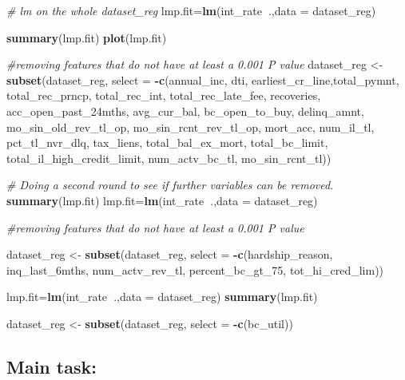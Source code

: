 \documentclass[]{article}
\newenvironment{Shaded}{\begin{snugshade}}{\end{snugshade}}
\newcommand{\CommentTok}[1]{\textcolor[rgb]{0.56,0.35,0.01}{\textit{#1}}}
\newcommand{\DataTypeTok}[1]{\textcolor[rgb]{0.13,0.29,0.53}{#1}}
\newcommand{\DecValTok}[1]{\textcolor[rgb]{0.00,0.00,0.81}{#1}}
\newcommand{\KeywordTok}[1]{\textcolor[rgb]{0.13,0.29,0.53}{\textbf{#1}}}
\newcommand{\NormalTok}[1]{#1}
\newcommand{\OperatorTok}[1]{\textcolor[rgb]{0.81,0.36,0.00}{\textbf{#1}}}
\newcommand{\StringTok}[1]{\textcolor[rgb]{0.31,0.60,0.02}{#1}}
\begin{document}
\begin{Shaded}
\begin{Highlighting}[]
\CommentTok{# lm on the whole dataset_reg}
\NormalTok{lmp.fit=}\KeywordTok{lm}\NormalTok{(int_rate}\OperatorTok{~}\NormalTok{.,}\DataTypeTok{data =}\NormalTok{ dataset_reg)}

\KeywordTok{summary}\NormalTok{(lmp.fit)}
\KeywordTok{plot}\NormalTok{(lmp.fit)}

\CommentTok{#removing features that do not have at least a 0.001 P value}
\NormalTok{dataset_reg <-}\StringTok{ }\KeywordTok{subset}\NormalTok{(dataset_reg, }\DataTypeTok{select =} \OperatorTok{-}\KeywordTok{c}\NormalTok{(annual_inc, dti, earliest_cr_line,total_pymnt, total_rec_prncp, total_rec_int, total_rec_late_fee, recoveries, acc_open_past_24mths, avg_cur_bal, bc_open_to_buy, delinq_amnt, mo_sin_old_rev_tl_op, mo_sin_rcnt_rev_tl_op, mort_acc, num_il_tl, pct_tl_nvr_dlq, tax_liens, total_bal_ex_mort, total_bc_limit, total_il_high_credit_limit, num_actv_bc_tl, mo_sin_rcnt_tl))}

\CommentTok{# Doing a second round to see if further variables can be removed.}
\KeywordTok{summary}\NormalTok{(lmp.fit)}
\NormalTok{lmp.fit=}\KeywordTok{lm}\NormalTok{(int_rate}\OperatorTok{~}\NormalTok{.,}\DataTypeTok{data =}\NormalTok{ dataset_reg)}

\CommentTok{#removing features that do not have at least a 0.001 P value}

\NormalTok{dataset_reg <-}\StringTok{ }\KeywordTok{subset}\NormalTok{(dataset_reg, }\DataTypeTok{select =} \OperatorTok{-}\KeywordTok{c}\NormalTok{(hardship_reason, inq_last_6mths, num_actv_rev_tl, percent_bc_gt_}\DecValTok{75}\NormalTok{, tot_hi_cred_lim))}
                  
\NormalTok{lmp.fit=}\KeywordTok{lm}\NormalTok{(int_rate}\OperatorTok{~}\NormalTok{.,}\DataTypeTok{data =}\NormalTok{ dataset_reg)}
\KeywordTok{summary}\NormalTok{(lmp.fit)}

\NormalTok{dataset_reg <-}\StringTok{ }\KeywordTok{subset}\NormalTok{(dataset_reg, }\DataTypeTok{select =} \OperatorTok{-}\KeywordTok{c}\NormalTok{(bc_util))}
\end{Highlighting}
\end{Shaded}

\pagebreak

\hypertarget{main-task}{%
\subsection{Main task:}\label{main-task}}
\end{document}
